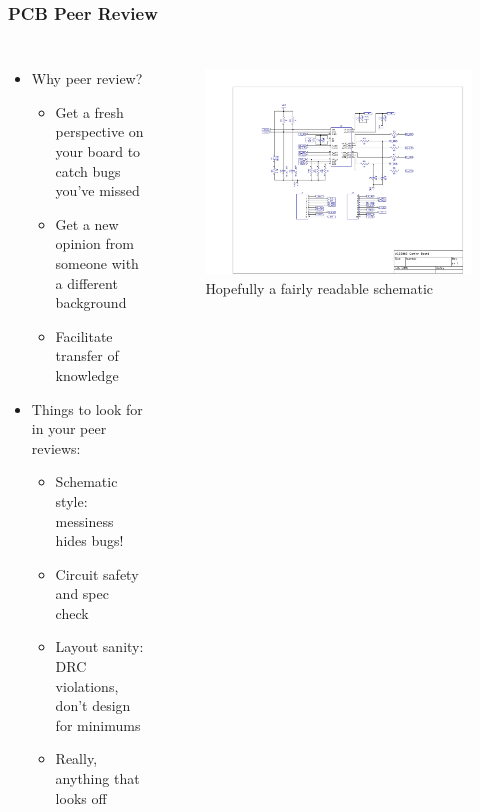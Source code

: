 \documentclass{beamer}
\begin{document}
\begin{frame}
\frametitle{PCB Peer Review}
\begin{columns}[t]
\begin{itemize}
  \item Why peer review?
  \begin{itemize}
    \item Get a fresh perspective on your board to catch bugs you've missed
    \item Get a new opinion from someone with a different background
    \item Facilitate transfer of knowledge
  \end{itemize}
  \item Things to look for in your peer reviews:
  \begin{itemize}
    \item Schematic style: messiness hides bugs!
    \item Circuit safety and spec check
    \item Layout sanity: DRC violations, don't design for minimums
    \item Really, anything that looks off
  \end{itemize}
\end{itemize}

\begin{figure}
  \centering
  \includegraphics[width=1.0\columnwidth]{images-dis5/mc33883-schematic} \\
  Hopefully a fairly readable schematic
\end{figure}
\end{columns}
\end{frame}
\end{document}
